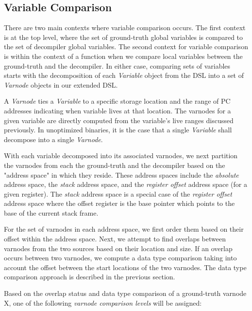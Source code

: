\subsection{Variable Comparison}

There are two main contexts where variable comparison occurs. The first context is at the top level, where the set of ground-truth global variables is compared to the set of decompiler global variables. The second context for variable comparison is within the context of a function when we compare local variables between the ground-truth and the decompiler. In either case, comparing sets of variables starts with the decomposition of each \emph{Variable} object from the DSL into a set of \emph{Varnode} objects in our extended DSL.

A \emph{Varnode} ties a \emph{Variable} to a specific storage location and the range of PC addresses indicating when variable lives at that location. The varnodes for a given variable are directly computed from the variable's live ranges discussed previously. In unoptimized binaries, it is the case that a single \emph{Variable} shall decompose into a single \emph{Varnode}.

With each variable decomposed into its associated varnodes, we next partition the varnodes from each the ground-truth and the decompiler based on the "address space" in which they reside. These address spaces include the \emph{absolute} address space, the \emph{stack} address space, and the \emph{register offset} address space (for a given register). The \emph{stack} address space is a special case of the \emph{register offset} address space where the offset register is the base pointer which points to the base of the current stack frame.

For the set of varnodes in each address space, we first order them based on their offset within the address space. Next, we attempt to find overlaps between varnodes from the two sources based on their location and size. If an overlap occurs between two varnodes, we compute a data type comparison taking into account the offset between the start locations of the two varnodes. The data type comparison approach is described in the previous section.

Based on the overlap status and data type comparison of a ground-truth varnode X, one of the following \emph{varnode comparison levels} will be assigned:

